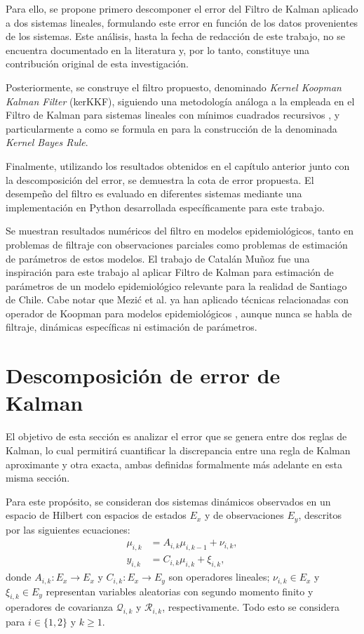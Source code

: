 Para ello, se propone primero descomponer el error del Filtro de Kalman aplicado a dos sistemas lineales, formulando este error en función de los datos provenientes de los sistemas. Este análisis, hasta la fecha de redacción de este trabajo, no se encuentra documentado en la literatura y, por lo tanto, constituye una contribución original de esta investigación.

Posteriormente, se construye el filtro propuesto, denominado \textit{Kernel Koopman Kalman Filter} (kerKKF), siguiendo una metodología análoga a la empleada en el Filtro de Kalman para sistemas lineales con mínimos cuadrados recursivos \cite{Kalman1960AProblems, Triantafyllopoulos2021BayesianBeyond}, y particularmente a como se formula en \cite{Gebhard2019} para la construcción de la denominada \textit{Kernel Bayes Rule}.

Finalmente, utilizando los resultados obtenidos en el capítulo anterior junto con la descomposición del error, se demuestra la cota de error propuesta. El desempeño del filtro es evaluado en diferentes sistemas mediante una implementación en Python desarrollada específicamente para este trabajo.

Se muestran resultados numéricos del filtro en modelos epidemiológicos, tanto en problemas de filtraje con observaciones parciales como problemas de estimación de parámetros de estos modelos. El trabajo de Catalán Muñoz \cite{CatalanMunoz2022DesarrolloChile} fue una inspiración para este trabajo al aplicar Filtro de Kalman para estimación de parámetros de un modelo epidemiológico relevante para la realidad de Santiago de Chile. Cabe notar que Mezić et al. ya han aplicado técnicas relacionadas con operador de Koopman para modelos epidemiológicos \cite{Mezic2024ACases}, aunque nunca se habla de filtraje, dinámicas específicas ni estimación de parámetros. 

\section{Descomposición de error de Kalman}

El objetivo de esta sección es analizar el error que se genera entre dos reglas de Kalman, lo cual permitirá cuantificar la discrepancia entre una regla de Kalman aproximante y otra exacta, ambas definidas formalmente más adelante en esta misma sección. 

Para este propósito, se consideran dos sistemas dinámicos observados en un espacio de Hilbert con espacios de estados $E_x$ y de observaciones $E_y$, descritos por las siguientes ecuaciones:  
\begin{equation*}
	\begin{aligned}
		\mu_{i,k}  &= A_{i,k} \mu_{i,k-1} + \nu_{i,k}, \\
		y_{i,k} &= C_{i,k} \mu_{i,k} + \xi_{i,k},
	\end{aligned}
\end{equation*}
donde $A_{i,k} : E_x \to E_x$ y $C_{i,k}: E_x \to E_y$ son operadores lineales; $\nu_{i,k} \in E_x$ y $\xi_{i,k} \in E_y$ representan variables aleatorias con segundo momento finito y operadores de covarianza $\mathcal{Q}_{i,k}$ y $\mathcal{R}_{i,k}$, respectivamente. Todo esto se considera para $i \in \{1,2\}$ y $k \geq 1$.

